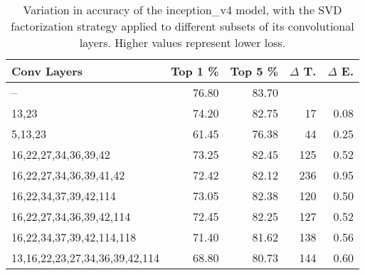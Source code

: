 \begin{table}
\centering
\begin{tabular}{|l|r|r|r|r|}
\hline
Conv Layers & Top 1 \% & Top 5 \% & $\Delta$ T. & $\Delta$ E. \\\hline
-- & 76.80 & 83.70 &  & \\\hline
13,23 & 74.20 & 82.75 & 17 & 0.08 \\\hline
5,13,23 & 61.45 & 76.38 & 44 & 0.25 \\\hline
16,22,27,34,36,39,42 & 73.25 & 82.45 & 125 & 0.52 \\\hline
16,22,27,34,36,39,41,42 & 72.42 & 82.12 & 236 & 0.95 \\\hline
16,22,34,37,39,42,114 & 73.05 & 82.38 & 120 & 0.50 \\\hline
16,22,27,34,36,39,42,114 & 72.45 & 82.25 & 127 & 0.52 \\\hline
16,22,34,37,39,42,114,118 & 71.40 & 81.62 & 138 & 0.56 \\\hline
13,16,22,23,27,34,36,39,42,114 & 68.80 & 80.73 & 144 & 0.60 \\\hline
\end{tabular}
\caption{Variation in accuracy of the inception\_v4 model, with the SVD factorization strategy applied to different subsets of its convolutional layers. Higher values represent lower loss.}
\label{inception_v4-accuracy}
\end{table}
